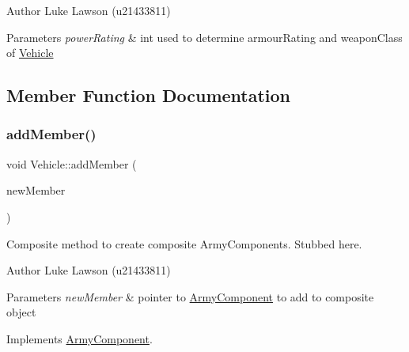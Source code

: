 \begin{DoxyAuthor}{Author}
Luke Lawson (u21433811) 
\end{DoxyAuthor}

\begin{DoxyParams}{Parameters}
{\em power\+Rating} & int used to determine armour\+Rating and weapon\+Class of \mbox{\hyperlink{class_vehicle}{Vehicle}} \\
\hline
\end{DoxyParams}


\subsection{Member Function Documentation}
\mbox{\label{class_vehicle_ae704e3c6f06b96ab5deff0ab0ef510f5}} 
\subsubsection{\texorpdfstring{addMember()}{addMember()}}
{\footnotesize\ttfamily void Vehicle\+::add\+Member (\begin{DoxyParamCaption}\item[{\mbox{\hyperlink{class_army_component}{Army\+Component}} $\ast$}]{new\+Member }\end{DoxyParamCaption})\hspace{0.3cm}{\ttfamily [virtual]}}



Composite method to create composite Army\+Components. Stubbed here. 

\begin{DoxyAuthor}{Author}
Luke Lawson (u21433811) 
\end{DoxyAuthor}

\begin{DoxyParams}{Parameters}
{\em new\+Member} & pointer to \mbox{\hyperlink{class_army_component}{Army\+Component}} to add to composite object \\
\hline
\end{DoxyParams}


Implements \mbox{\hyperlink{class_army_component_aae30fdd85af73102e011cb053ddb96b3}{Army\+Component}}.

\mbox{\label{class_vehicle_ae87cbec24f436b431fbed096024c41c9}} 
